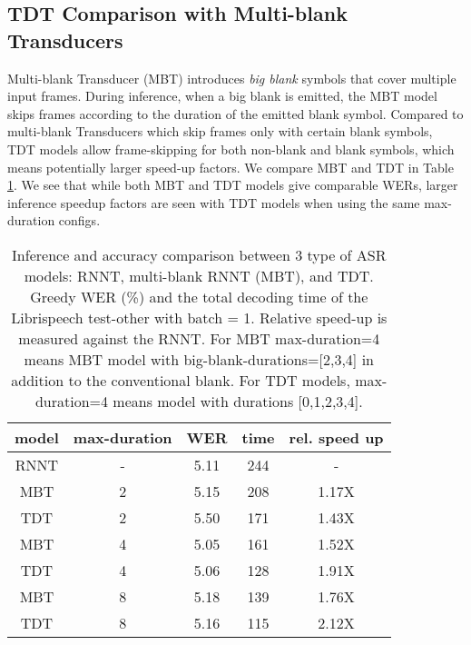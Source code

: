 \documentclass{article}
\begin{document}
\subsection{TDT Comparison with Multi-blank Transducers}
Multi-blank Transducer (MBT) \cite{xu2022multi} introduces \emph{big blank} symbols that cover multiple input frames. During inference, when a big blank is emitted, the MBT model skips frames according to the duration of the emitted blank symbol. Compared to multi-blank Transducers which skip frames only with certain blank symbols,  TDT models allow frame-skipping for both non-blank and blank symbols,  which means potentially larger speed-up factors. We compare MBT and TDT in Table \ref{compare_multiblank}. We see that while both MBT and TDT models give comparable WERs, larger inference speedup factors  are seen with TDT models when using the same max-duration configs. \begin{table}[t]
    \centering
    \begin{tabular}{c c c c c}
    \toprule
    model & max-duration & WER & time & rel. speed up \\
    \midrule
    RNNT        & - & 5.11 & 244 & - \\
    \midrule
    MBT              & 2     & 5.15  & 208 &  1.17X \\
    TDT              & 2     & 5.50 & 171 & 1.43X \\   
    \midrule
    MBT              & 4     & 5.05 & 161 & 1.52X \\
    TDT              & 4     & 5.06 & 128 & 1.91X  \\
    \midrule
    MBT              & 8     & 5.18 & 139 & 1.76X \\
    TDT              & 8     & 5.16 & 115 & 2.12X \\
    \bottomrule
    \end{tabular}
    \caption{Inference and accuracy comparison between 3 type of ASR models: RNNT, multi-blank RNNT (MBT), and TDT. Greedy WER (\%) and the total decoding time of the Librispeech test-other with batch = 1. Relative speed-up is measured against the RNNT. For MBT max-duration=4 means MBT model with big-blank-durations=[2,3,4] in addition to the conventional blank. For TDT models,  max-duration=4 means model with durations [0,1,2,3,4].}
    \label{compare_multiblank}
\end{table}
\end{document}
